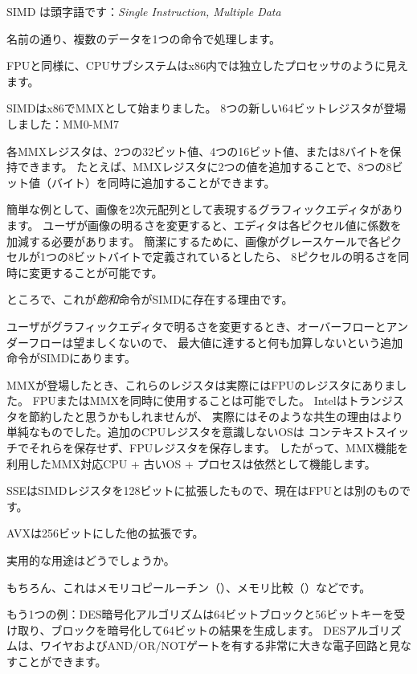 ﻿

\label{SIMD_x86}
\ac{SIMD} は頭字語です：\emph{Single Instruction, Multiple Data}

名前の通り、複数のデータを1つの命令で処理します。

\ac{FPU}と同様に、\ac{CPU}サブシステムはx86内では独立したプロセッサのように見えます。


SIMDはx86でMMXとして始まりました。 8つの新しい64ビットレジスタが登場しました：MM0-MM7

各MMXレジスタは、2つの32ビット値、4つの16ビット値、または8バイトを保持できます。
たとえば、MMXレジスタに2つの値を追加することで、8つの8ビット値（バイト）を同時に追加することができます。

簡単な例として、画像を2次元配列として表現するグラフィックエディタがあります。
ユーザが画像の明るさを変更すると、エディタは各ピクセル値に係数を加減する必要があります。
簡潔にするために、画像がグレースケールで各ピクセルが1つの8ビットバイトで定義されているとしたら、
8ピクセルの明るさを同時に変更することが可能です。

ところで、これが\emph{飽和}命令がSIMDに存在する理由です。

ユーザがグラフィックエディタで明るさを変更するとき、オーバーフローとアンダーフローは望ましくないので、
最大値に達すると何も加算しないという追加命令がSIMDにあります。

MMXが登場したとき、これらのレジスタは実際にはFPUのレジスタにありました。 
FPUまたはMMXを同時に使用することは可能でした。 Intelはトランジスタを節約したと思うかもしれませんが、
実際にはそのような共生の理由はより単純なものでした。追加のCPUレジスタを意識しない\ac{OS}は
コンテキストスイッチでそれらを保存せず、FPUレジスタを保存します。
したがって、MMX機能を利用したMMX対応CPU + 古い\ac{OS} + プロセスは依然として機能します。

SSEはSIMDレジスタを128ビットに拡張したもので、現在はFPUとは別のものです。

AVXは256ビットにした他の拡張です。

実用的な用途はどうでしょうか。

もちろん、これはメモリコピールーチン（）、メモリ比較（）などです。


もう1つの例：DES暗号化アルゴリズムは64ビットブロックと56ビットキーを受け取り、ブロックを暗号化して64ビットの結果を生成します。 
DESアルゴリズムは、ワイヤおよびAND/OR/NOTゲートを有する非常に大きな電子回路と見なすことができます。

